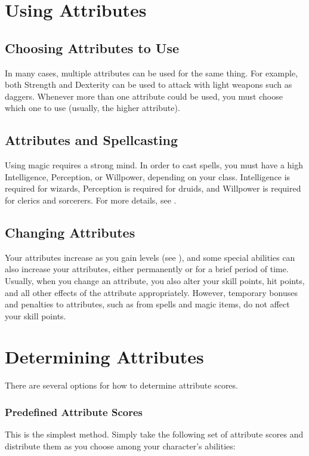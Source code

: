\section{Using Attributes}

\subsection{Choosing Attributes to Use}
In many cases, multiple attributes can be used for the same thing. For example, both Strength and Dexterity can be used to attack with light weapons such as daggers. Whenever more than one attribute could be used, you must choose which one to use (usually, the higher attribute).

\subsection{Attributes and Spellcasting}
Using magic requires a strong mind. In order to cast spells, you must have a high Intelligence, Perception, or Willpower, depending on your class. Intelligence is required for wizards, Perception is required for druids, and Willpower is required for clerics and sorcerers. For more details, see .

\subsection{Changing Attributes}

Your attributes increase as you gain levels (see ), and some special abilities can also increase your attributes, either permanently or for a brief period of time. Usually, when you change an attribute, you also alter your skill points, hit points, and all other effects of the attribute appropriately. However, temporary bonuses and penalties to attributes, such as from spells and magic items, do not affect your skill points.

\section{Determining Attributes}
There are several options for how to determine attribute scores.

\subsubsection{Predefined Attribute Scores}
This is the simplest method. Simply take the following set of attribute scores and distribute them as you choose among your character's abilities:

